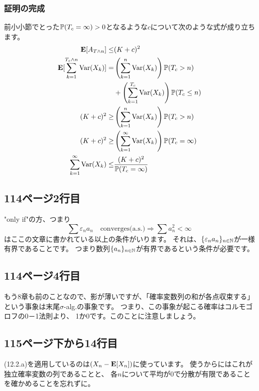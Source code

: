     \subsubsection{証明の完成}
      前小小節でとった${\mathbb{P}}(T_c = \infty) > 0$となるような$c$について次のような式が成り立ちます。
      \begin{align*}
        {\mathbf{E}}[A_{T \wedge n}] \leq& (K + c)^2 \\
        {\mathbf{E}}[\sum_{k = 1}^{T_c \wedge n}{\text{Var}}(X_k)] =& \left( \sum_{k=1}^n {\text{Var}}(X_k)\right) {\mathbb{P}}(T_c > n)\\
        &+ \left( \sum_{k=1}^{T_c} {\text{Var}}(X_k)\right) {\mathbb{P}}(T_c \leq n)\\
        (K + c)^2 \ge& \left( \sum_{k=1}^n {\text{Var}}(X_k)\right) {\mathbb{P}}(T_c > n)\\
        (K + c)^2 \ge& \left( \sum_{k=1}^{\infty} {\text{Var}}(X_k)\right) {\mathbb{P}}(T_c = \infty)\\
        \sum_{k=1}^{\infty} {\text{Var}}(X_k) \leq& \frac{(K + c)^2}{{\mathbb{P}}(T_c = \infty)}
      \end{align*}

  \subsection{114ページ2行目}
    "only if"の方、つまり
    \[\sum \varepsilon_n a_n \quad \text{converges(a.s.)} \Rightarrow \sum a_n^2 < \infty\]
    はここの文章に書かれている以上の条件がいります。
    それは、$\{\varepsilon_n a_n\}_{n \in {\mathbb{N}}}$が一様有界であることです。
    つまり数列$\{a_n\}_{n \in {\mathbb{N}}}$が有界であるという条件が必要です。

  \subsection{114ページ4行目}
    もう8章も前のことなので、影が薄いですが、「確率変数列の和が各点収束する」
    という事象は末尾$\sigma$-alg.の事象です。
    つまり、この事象が起こる確率はコルモゴロフの0－1法則より、
    1か0です。このことに注意しましょう。

  \subsection{115ページ下から14行目}
    (12.2.a)を適用しているのは$(X_n - {\mathbf{E}}[X_n])$に使っています。
    使うからにはこれが独立確率変数の列であることと、
    各$n$について平均が0で分散が有限であることを確かめることを忘れずに。

